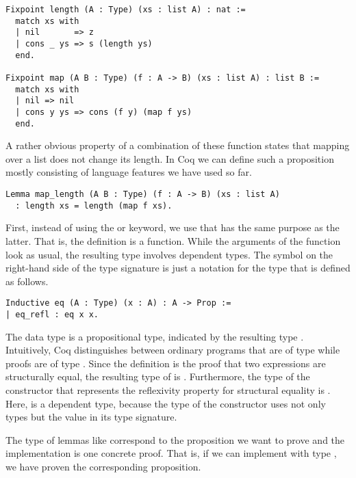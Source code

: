 \begin{verbatim}
Fixpoint length (A : Type) (xs : list A) : nat :=
  match xs with
  | nil       => z
  | cons _ ys => s (length ys)
  end.

Fixpoint map (A B : Type) (f : A -> B) (xs : list A) : list B :=
  match xs with
  | nil => nil
  | cons y ys => cons (f y) (map f ys)
  end.
\end{verbatim}

A rather obvious property of a combination of these function states that mapping over a list does not change its length.
In Coq we can define such a proposition mostly consisting of language features we have used so far.

\begin{verbatim}
Lemma map_length (A B : Type) (f : A -> B) (xs : list A)
  : length xs = length (map f xs).
\end{verbatim}

First, instead of using the  or  keyword, we use  that has the same purpose as the latter.
That is, the definition  is a function.
While the arguments of the function  look as usual, the resulting type involves dependent types.
The symbol \cinl{=} on the right-hand side of the type signature is just a notation for the type  that is defined as follows.

\begin{verbatim}
Inductive eq (A : Type) (x : A) : A -> Prop :=
| eq_refl : eq x x.
\end{verbatim}

The data type  is a propositional type, indicated by the resulting type .
Intuitively, Coq distinguishes between ordinary programs that are of type  while proofs are of type .
Since the definition  is the proof that two expressions are structurally equal, the resulting type of  is .
Furthermore, the type of the constructor  that represents the reflexivity property for structural equality is .
Here,  is a dependent type, because the type of the constructor  uses not only types but the value  in its type signature.

The type of lemmas like  correspond to the proposition we want to prove and the implementation is one concrete proof.
That is, if we can implement  with type , we have proven the corresponding proposition.

